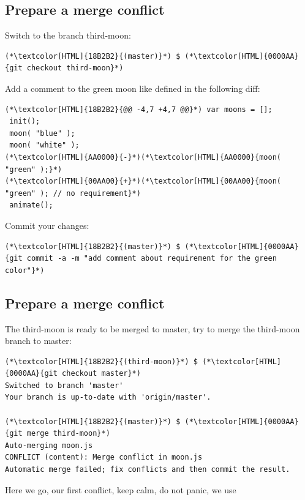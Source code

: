 \subsection{Prepare a merge conflict}
\begin{frame}[fragile]
  \subslidetitle

  Switch to the branch third-moon:
  \begin{lstlisting}
(*\textcolor[HTML]{18B2B2}{(master)}*) $ (*\textcolor[HTML]{0000AA}{git checkout third-moon}*)
\end{lstlisting}

  Add a comment to the green moon like defined in the following diff:
  \begin{lstlisting}
(*\textcolor[HTML]{18B2B2}{@@ -4,7 +4,7 @@}*) var moons = [];
 init();
 moon( "blue" );
 moon( "white" );
(*\textcolor[HTML]{AA0000}{-}*)(*\textcolor[HTML]{AA0000}{moon( "green" );}*)
(*\textcolor[HTML]{00AA00}{+}*)(*\textcolor[HTML]{00AA00}{moon( "green" ); // no requirement}*)
 animate();
\end{lstlisting}

  Commit your changes:
  \begin{lstlisting}
(*\textcolor[HTML]{18B2B2}{(master)}*) $ (*\textcolor[HTML]{0000AA}{git commit -a -m "add comment about requirement for the green color"}*)
\end{lstlisting}
\end{frame}

\subsection{Prepare a merge conflict}
\begin{frame}[fragile]
  \subslidetitle

  The third-moon is ready to be merged to master, try to merge the third-moon branch to master:
  \begin{lstlisting}
(*\textcolor[HTML]{18B2B2}{(third-moon)}*) $ (*\textcolor[HTML]{0000AA}{git checkout master}*)
Switched to branch 'master'
Your branch is up-to-date with 'origin/master'.

(*\textcolor[HTML]{18B2B2}{(master)}*) $ (*\textcolor[HTML]{0000AA}{git merge third-moon}*)
Auto-merging moon.js
CONFLICT (content): Merge conflict in moon.js
Automatic merge failed; fix conflicts and then commit the result.
\end{lstlisting}

  Here we go, our first conflict, keep calm, do not panic, we use 
\end{frame}

